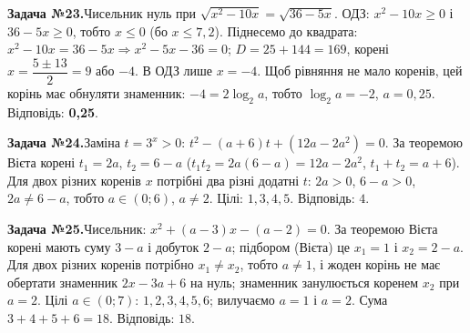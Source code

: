 \documentclass[12pt]{article}
\begin{document}
\par\vspace{0.3cm}\noindent\hypertarget{sol:23}{}
\begin{tcolorbox}[colback=titleBg!40, colframe=mainGreen!55, boxrule=0.4pt, arc=2pt, left=6pt, right=6pt, top=4pt, bottom=4pt, breakable]
\noindent\small\textbf{Задача №23.}\quad Чисельник нуль при $\sqrt{x^2-10x}=\sqrt{36-5x}$. ОДЗ: $x^2-10x\ge 0$ і $36-5x\ge 0$, тобто $x\le 0$ (бо $x\le 7{,}2$). Піднесемо до квадрата: $x^2-10x=36-5x \Rightarrow x^2-5x-36=0$; $D=25+144=169$, корені $x=\dfrac{5\pm 13}{2}=9$ або $-4$. В ОДЗ лише $x=-4$. Щоб рівняння не мало коренів, цей корінь має обнуляти знаменник: $-4=2\log_2 a$, тобто $\log_2 a=-2$, $a=0{,}25$. Відповідь: \textbf{0,25}.
\par\vspace{0.1cm}\hfill\hyperlink{task:23}{}
\end{tcolorbox}
\par\vspace{0.3cm}\noindent\hypertarget{sol:24}{}
\begin{tcolorbox}[colback=titleBg!40, colframe=mainGreen!55, boxrule=0.4pt, arc=2pt, left=6pt, right=6pt, top=4pt, bottom=4pt, breakable]
\noindent\small\textbf{Задача №24.}\quad Заміна $t=3^x>0$: $t^2-(a+6)t+(12a-2a^2)=0$. За теоремою Вієта корені $t_1=2a$, $t_2=6-a$ ($t_1t_2=2a(6-a)=12a-2a^2$, $t_1+t_2=a+6$). Для двох різних коренів $x$ потрібні два різні додатні $t$: $2a>0$, $6-a>0$, $2a\neq6-a$, тобто $a\in(0;6)$, $a\neq2$. Цілі: $1,3,4,5$. Відповідь: $4$.
\par\vspace{0.1cm}\hfill\hyperlink{task:24}{}
\end{tcolorbox}
\par\vspace{0.3cm}\noindent\hypertarget{sol:25}{}
\begin{tcolorbox}[colback=titleBg!40, colframe=mainGreen!55, boxrule=0.4pt, arc=2pt, left=6pt, right=6pt, top=4pt, bottom=4pt, breakable]
\noindent\small\textbf{Задача №25.}\quad Чисельник: $x^2+(a-3)x-(a-2)=0$. За теоремою Вієта корені мають суму $3-a$ і добуток $2-a$; підбором (Вієта) це $x_1=1$ і $x_2=2-a$. Для двох різних коренів потрібно $x_1\ne x_2$, тобто $a\ne 1$, і жоден корінь не має обертати знаменник $2x-3a+6$ на нуль; знаменник занулюється коренем $x_2$ при $a=2$. Цілі $a\in(0;7)$: $1,2,3,4,5,6$; вилучаємо $a=1$ і $a=2$. Сума $3+4+5+6=18$. Відповідь: \textbf{$18$}.
\par\vspace{0.1cm}\hfill\hyperlink{task:25}{}
\end{tcolorbox}
\end{document}
